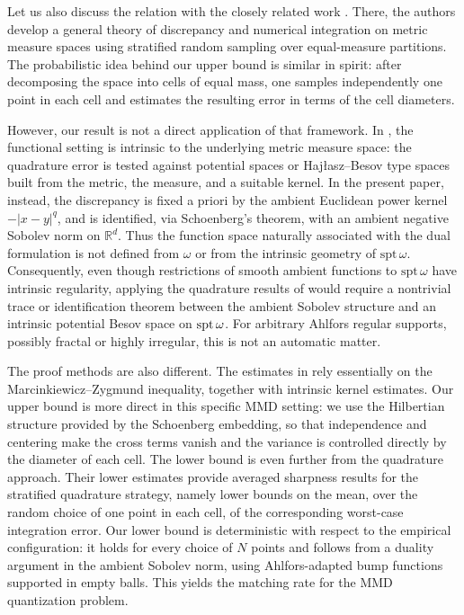\documentclass[12pt,a4paper,oneside]{amsart}
\theoremstyle{plain}
\theoremstyle{definition}
\numberwithin{equation}{section}
\numberwithin{figure}{section}
\numberwithin{table}{section}
\theoremstyle{remark}
\begin{document}
Let us also discuss the relation with the closely related work
\cite{ColzaniGigante}. There, the authors develop a
general theory of discrepancy and numerical integration on metric measure spaces
using stratified random sampling over equal-measure partitions. The probabilistic
idea behind our upper bound is similar in spirit: after decomposing the space into
cells of equal mass, one samples independently one point in each cell and estimates
the resulting error in terms of the cell diameters.

However, our result is not a direct application of that framework. In
\cite{ColzaniGigante}, the functional setting is
intrinsic to the underlying metric measure space: the quadrature error is tested
against potential spaces or Haj{\l}asz--Besov type spaces built from the metric,
the measure, and a suitable kernel. In the present paper, instead, the discrepancy is
fixed a priori by the ambient Euclidean power kernel $-|x-y|^q$, and is identified,
via Schoenberg's theorem, with an ambient negative Sobolev norm on $\mathbb R^d$.
Thus the function space naturally associated with the dual formulation is not
defined from $\omega$ or from the intrinsic geometry of $\mathrm{spt}\,\omega$.
Consequently, even though restrictions of smooth ambient functions to
$\mathrm{spt}\,\omega$ have intrinsic regularity, applying the quadrature
results of \cite{ColzaniGigante} would require a
nontrivial trace or identification theorem between the ambient Sobolev structure and
an intrinsic potential Besov space on $\textup{spt}\,\omega$. For arbitrary
Ahlfors regular supports, possibly fractal or highly irregular, this is not an
automatic matter.

The proof methods are also different. The estimates in
\cite{ColzaniGigante} rely essentially on the
Marcinkiewicz--Zygmund inequality, together with intrinsic kernel estimates. Our
upper bound is more direct in this specific MMD setting: we use the Hilbertian
structure provided by the Schoenberg embedding, so that independence and centering
make the cross terms vanish and the variance is controlled directly by the diameter
of each cell. The lower bound is even further from the quadrature approach. Their
lower estimates provide averaged sharpness results for the stratified quadrature
strategy, namely lower bounds on the mean, over the random choice of one point in
each cell, of the corresponding worst-case integration error. Our lower bound is
deterministic with respect to the empirical configuration: it holds for every choice
of $N$ points and follows from a duality argument in the ambient Sobolev norm,
using Ahlfors-adapted bump functions supported in empty balls. This yields the
matching rate for the MMD quantization problem.
\end{document}
